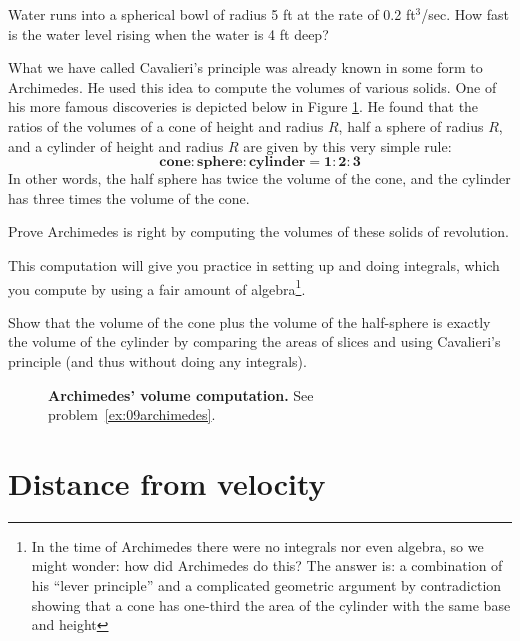 \begin{multicols}{2}
\subprob  Water runs into a spherical bowl of radius 5 ft at
the rate of 0.2 ft${}^3$/sec. How fast is the water level rising
when the water is 4 ft deep?

\problem \label{ex:09archimedes} %
What we have called Cavalieri's principle was already known in some
form to Archimedes.  He used this idea to compute the volumes of
various solids.  One of his more famous discoveries is depicted below
in Figure \ref{fig:09archimedes-sphere-cone-cylinder}.  He found that
the ratios of the volumes of a cone of height and radius $R$,
half a sphere of radius $R$, and a cylinder of height and
radius $R$ are given by this very simple rule:
\[
  \textbf{cone}:
  \textbf{sphere}:
  \textbf{cylinder}
  =
  \textbf{1}:\textbf{2}:\textbf{3}
\]
In other words, the half sphere has twice the volume of the cone, and the
cylinder has three times the volume of the cone.

\subprob Prove Archimedes is right by computing the volumes of these solids
of revolution.  

\smallskip

This computation will give you practice in setting up and doing integrals, which
you compute by using a fair amount of algebra\footnote{In the time of Archimedes there were no integrals nor even algebra, so we might wonder: how did Archimedes do this? The answer is: a combination of his ``lever principle'' and a complicated geometric argument by contradiction showing that a cone has one-third the area of the cylinder with the same base and height}.

\carefulnow\subprob Show that the volume of the cone plus the volume of the half-sphere is
exactly the volume of the cylinder by comparing the areas of slices and using
Cavalieri's principle (and thus without doing any integrals).

\end{multicols}
\noproblemfont
\begin{figure}[h]
  \centering 
  \caption{\textbf{Archimedes' volume computation. }  See
    problem~\ref{ex:09archimedes}.}
  \label{fig:09archimedes-sphere-cone-cylinder}
\end{figure}

\section{Distance from velocity} %

